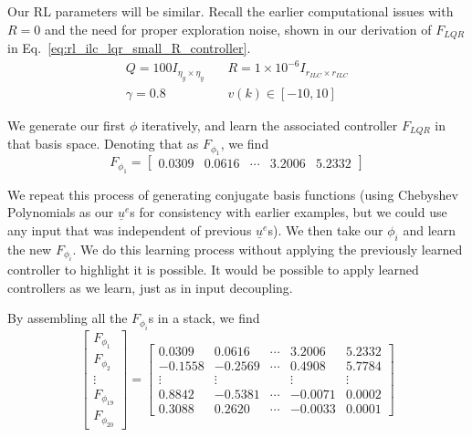 Our RL parameters will be similar. Recall the earlier computational issues with $R=0$ and the need for proper exploration noise, shown in our derivation of $F_{LQR}$ in Eq.~\ref{eq:rl_ilc_lqr_small_R_controller}. 
\begin{equation}
    \begin{split}
        Q = 100I_{\eta_y \times \eta_y}
        &\quad
        R = 1\times 10 ^ {-6} I_{r_{ILC} \times r_{ILC}}
        \\
        \gamma = 0.8
        &\quad
        v(k) \in \left[-10, 10\right]
    \end{split}
    \label{eq:rl_params_ilc_fixed_res}
\end{equation}

We generate our first $\phi$ iteratively, and learn the associated controller $F_{LQR}$ in that basis space. Denoting that as $F_{\phi_1}$, we find
\begin{equation}
    F_{\phi_1} =
    \begin{bmatrix}
        0.0309  &  0.0616  & \cdots &  3.2006  &  5.2332
    \end{bmatrix}
\end{equation}

We repeat this process of generating conjugate basis functions (using Chebyshev Polynomials as our $\underline{u}^e$s for consistency with earlier examples, but we could use any input that was independent of previous $\underline{u}^e$s). We then take our $\phi_i$ and learn the new $F_{\phi_i}$. We do this learning process without applying the previously learned controller to highlight it is possible. It would be possible to apply learned controllers as we learn, just as in input decoupling.

By assembling all the $F_{\phi_i}$s in a stack, we find
\begin{equation}
    \begin{bmatrix}
        F_{\phi_1} \\ F_{\phi_2} \\ \vdots \\ F_{\phi_{19}} \\ F_{\phi_{20}}
    \end{bmatrix}
    = 
    \begin{bmatrix}
        0.0309  &  0.0616 & \cdots & 3.2006  &  5.2332 \\
        -0.1558 &  -0.2569 & \cdots & 0.4908  &  5.7784 \\
        \vdots & \vdots & & \vdots & \vdots \\
        0.8842 &  -0.5381& \cdots & -0.0071  &  0.0002 \\
        0.3088&    0.2620& \cdots & -0.0033  &  0.0001 
    \end{bmatrix}
    \label{eq:fixed_res_conjugate_controller}
\end{equation}

